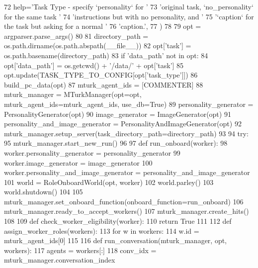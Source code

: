 \begin{DoxyCode}
72         help=\textcolor{stringliteral}{'Task Type - specify `personality` for '}
73         \textcolor{stringliteral}{'original task, `no\_personality` for the same task '}
74         \textcolor{stringliteral}{'instructions but with no personality, and '}
75         \textcolor{stringliteral}{'`caption` for the task but asking for a normal '}
76         \textcolor{stringliteral}{'caption.'},
77     )
78 
79     opt = argparser.parse\_args()
80 
81     directory\_path = os.path.dirname(os.path.abspath(\_\_file\_\_))
82     opt[\textcolor{stringliteral}{'task'}] = os.path.basename(directory\_path)
83     \textcolor{keywordflow}{if} \textcolor{stringliteral}{'data\_path'} \textcolor{keywordflow}{not} \textcolor{keywordflow}{in} opt:
84         opt[\textcolor{stringliteral}{'data\_path'}] = os.getcwd() + \textcolor{stringliteral}{'/data/'} + opt[\textcolor{stringliteral}{'task'}]
85     opt.update(TASK\_TYPE\_TO\_CONFIG[opt[\textcolor{stringliteral}{'task\_type'}]])
86     build\_pc\_data(opt)
87     mturk\_agent\_ids = [COMMENTER]
88     mturk\_manager = MTurkManager(opt=opt, mturk\_agent\_ids=mturk\_agent\_ids, use\_db=\textcolor{keyword}{True})
89     personality\_generator = PersonalityGenerator(opt)
90     image\_generator = ImageGenerator(opt)
91     personality\_and\_image\_generator = PersonalityAndImageGenerator(opt)
92     mturk\_manager.setup\_server(task\_directory\_path=directory\_path)
93 
94     \textcolor{keywordflow}{try}:
95         mturk\_manager.start\_new\_run()
96 
97         \textcolor{keyword}{def }run\_onboard(worker):
98             worker.personality\_generator = personality\_generator
99             worker.image\_generator = image\_generator
100             worker.personality\_and\_image\_generator = personality\_and\_image\_generator
101             world = RoleOnboardWorld(opt, worker)
102             world.parley()
103             world.shutdown()
104 
105         mturk\_manager.set\_onboard\_function(onboard\_function=run\_onboard)
106         mturk\_manager.ready\_to\_accept\_workers()
107         mturk\_manager.create\_hits()
108 
109         \textcolor{keyword}{def }check\_worker\_eligibility(worker):
110             \textcolor{keywordflow}{return} \textcolor{keyword}{True}
111 
112         \textcolor{keyword}{def }assign\_worker\_roles(workers):
113             \textcolor{keywordflow}{for} w \textcolor{keywordflow}{in} workers:
114                 w.id = mturk\_agent\_ids[0]
115 
116         \textcolor{keyword}{def }run\_conversation(mturk\_manager, opt, workers):
117             agents = workers[:]
118             conv\_idx = mturk\_manager.conversation\_index

\end{DoxyCode}
